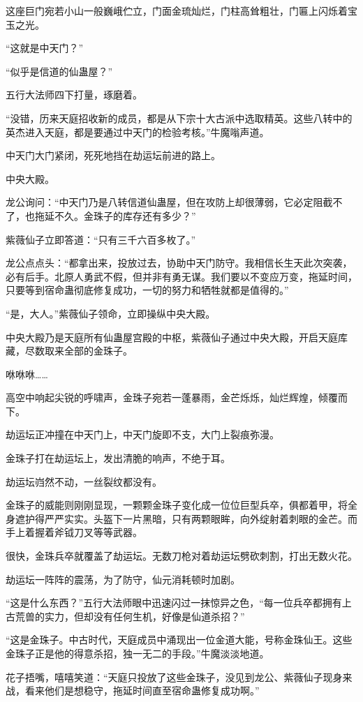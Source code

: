 \begin{this_body}
这座巨门宛若小山一般巍峨伫立，门面金琉灿烂，门柱高耸粗壮，门匾上闪烁着宝玉之光。

“这就是中天门？”

“似乎是信道的仙蛊屋？”

五行大法师四下打量，琢磨着。

“没错，历来天庭招收新的成员，都是从下宗十大古派中选取精英。这些八转中的英杰进入天庭，都是要通过中天门的检验考核。”牛魔嗡声道。

中天门大门紧闭，死死地挡在劫运坛前进的路上。

中央大殿。

龙公询问：“中天门乃是八转信道仙蛊屋，但在攻防上却很薄弱，它必定阻截不了，也拖延不久。金珠子的库存还有多少？”

紫薇仙子立即答道：“只有三千六百多枚了。”

龙公点点头：“都拿出来，投放过去，协助中天门防守。我相信长生天此次突袭，必有后手。北原人勇武不假，但并非有勇无谋。我们要以不变应万变，拖延时间，只要等到宿命蛊彻底修复成功，一切的努力和牺牲就都是值得的。”

“是，大人。”紫薇仙子领命，立即操纵中央大殿。

中央大殿乃是天庭所有仙蛊屋宫殿的中枢，紫薇仙子通过中央大殿，开启天庭库藏，尽数取来全部的金珠子。

咻咻咻……

高空中响起尖锐的呼啸声，金珠子宛若一蓬暴雨，金芒烁烁，灿烂辉煌，倾覆而下。

劫运坛正冲撞在中天门上，中天门旋即不支，大门上裂痕弥漫。

金珠子打在劫运坛上，发出清脆的响声，不绝于耳。

劫运坛岿然不动，一丝裂纹都没有。

金珠子的威能则刚刚显现，一颗颗金珠子变化成一位位巨型兵卒，俱都着甲，将全身遮护得严严实实。头盔下一片黑暗，只有两颗眼眸，向外绽射着刺眼的金芒。而手上着握着斧钺刀叉等等武器。

很快，金珠兵卒就覆盖了劫运坛。无数刀枪对着劫运坛劈砍刺割，打出无数火花。

劫运坛一阵阵的震荡，为了防守，仙元消耗顿时加剧。

“这是什么东西？”五行大法师眼中迅速闪过一抹惊异之色，“每一位兵卒都拥有上古荒兽的实力，但却没有任何生机，好像是仙道杀招？”

“这是金珠子。中古时代，天庭成员中涌现出一位金道大能，号称金珠仙王。这些金珠子正是他的得意杀招，独一无二的手段。”牛魔淡淡地道。

花子捂嘴，嘻嘻笑道：“天庭只投放了这些金珠子，没见到龙公、紫薇仙子现身来战，看来他们是想稳守，拖延时间直至宿命蛊修复成功啊。”


\end{this_body}
